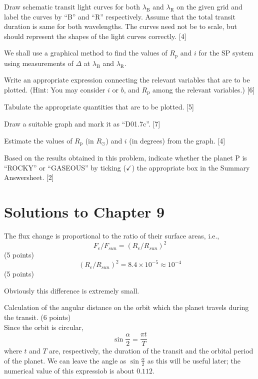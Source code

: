 \begin{description}
  Draw schematic transit light curves for both $\lambda_{\mathrm{B}}$ and
  $\lambda_{\mathrm{R}}$ on the given grid and label the curves by ``B'' and
  ``R'' respectively. Assume that the total transit duration is same for both
  wavelengths. The curves need not be to scale, but should represent the
  shapes of the light curves correctly. \hfill[4]
\item[(D01.7)] We shall use a graphical method to find the values of
  $R_{\mathrm{p}}$ and $i$ for the SP system using measurements of $\Delta$ at
  $\lambda_{\mathrm{B}}$ and $\lambda_{\mathrm{R}}$.
\item[(D01.7a)] Write an appropriate expression connecting the relevant
  variables that are to be plotted. (Hint: You may consider $i$ or $b$, and
  $R_{\mathrm{p}}$ among the relevant variables.) \hfill[6]
\item[(D01.7b)] Tabulate the appropriate quantities that are to be
  plotted. \hfill[5]
\item[(D01.7c)] Draw a suitable graph and mark it as ``D01.7c''. \hfill[7]
\item[(D01.7d)] Estimate the values of $R_{\mathrm{p}}$ (in $R_\odot$) and $i$
  (in degrees) from the graph. \hfill[4]
\item[(D01.8)] Based on the results obtained in this problem, indicate whether
  the planet P is ``ROCKY'' or ``GASEOUS'' by ticking ($\checkmark$) the
  appropriate box in the Summary Answersheet. \hfill[2]
\end{description}

\clearpage
\section*{Solutions to Chapter 9}


The flux change is proportional to the ratio of their surface areas, i.e.,
\[ F_e / F_{sun} = (R_e / R_{sun})^2 \]
\hfill(5 points)
\[ (R_e / R_{sun})^2 = 8.4\times10^{-5} \approx 10^{-4} \]
\hfill(5 points)

Obviously this difference is extremely small.

Calculation of the angular distance on the orbit which the planet travels
during the transit. \hfill(6 points)\\
Since the orbit is circular,
\[ \sin\frac{\alpha}{2} = \frac{\pi t}{T} \]
where $t$ and $T$ are, respectively, the duration of the transit and the
orbital period of the planet. We can leave the angle as $\sin\frac{\alpha}{2}$
as this will be useful later; the numerical value of this
expressiob %
is about $0.112$.

